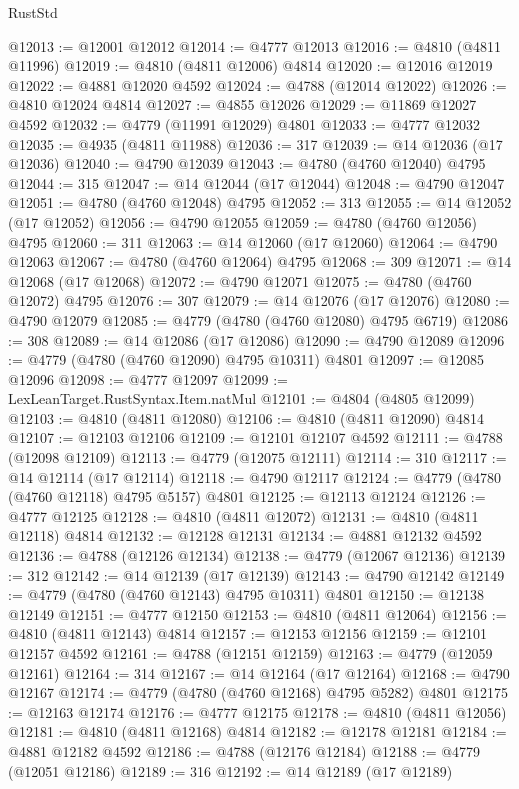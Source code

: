 \begin{lexlean}{RustStd}
\begin{coremodule}
@12013 := @12001 @12012
@12014 := @4777 @12013
@12016 := @4810 (@4811 @11996)
@12019 := @4810 (@4811 @12006) @4814
@12020 := @12016 @12019
@12022 := @4881 @12020 @4592
@12024 := @4788 (@12014 @12022)
@12026 := @4810 @12024 @4814
@12027 := @4855 @12026
@12029 := @11869 @12027 @4592
@12032 := @4779 (@11991 @12029) @4801
@12033 := @4777 @12032
@12035 := @4935 (@4811 @11988)
@12036 := 317
@12039 := @14 @12036 (@17 @12036)
@12040 := @4790 @12039
@12043 := @4780 (@4760 @12040) @4795
@12044 := 315
@12047 := @14 @12044 (@17 @12044)
@12048 := @4790 @12047
@12051 := @4780 (@4760 @12048) @4795
@12052 := 313
@12055 := @14 @12052 (@17 @12052)
@12056 := @4790 @12055
@12059 := @4780 (@4760 @12056) @4795
@12060 := 311
@12063 := @14 @12060 (@17 @12060)
@12064 := @4790 @12063
@12067 := @4780 (@4760 @12064) @4795
@12068 := 309
@12071 := @14 @12068 (@17 @12068)
@12072 := @4790 @12071
@12075 := @4780 (@4760 @12072) @4795
@12076 := 307
@12079 := @14 @12076 (@17 @12076)
@12080 := @4790 @12079
@12085 := @4779 (@4780 (@4760 @12080) @4795 @6719)
@12086 := 308
@12089 := @14 @12086 (@17 @12086)
@12090 := @4790 @12089
@12096 := @4779 (@4780 (@4760 @12090) @4795 @10311) @4801
@12097 := @12085 @12096
@12098 := @4777 @12097
@12099 := LexLeanTarget.RustSyntax.Item.natMul
@12101 := @4804 (@4805 @12099)
@12103 := @4810 (@4811 @12080)
@12106 := @4810 (@4811 @12090) @4814
@12107 := @12103 @12106
@12109 := @12101 @12107 @4592
@12111 := @4788 (@12098 @12109)
@12113 := @4779 (@12075 @12111)
@12114 := 310
@12117 := @14 @12114 (@17 @12114)
@12118 := @4790 @12117
@12124 := @4779 (@4780 (@4760 @12118) @4795 @5157) @4801
@12125 := @12113 @12124
@12126 := @4777 @12125
@12128 := @4810 (@4811 @12072)
@12131 := @4810 (@4811 @12118) @4814
@12132 := @12128 @12131
@12134 := @4881 @12132 @4592
@12136 := @4788 (@12126 @12134)
@12138 := @4779 (@12067 @12136)
@12139 := 312
@12142 := @14 @12139 (@17 @12139)
@12143 := @4790 @12142
@12149 := @4779 (@4780 (@4760 @12143) @4795 @10311) @4801
@12150 := @12138 @12149
@12151 := @4777 @12150
@12153 := @4810 (@4811 @12064)
@12156 := @4810 (@4811 @12143) @4814
@12157 := @12153 @12156
@12159 := @12101 @12157 @4592
@12161 := @4788 (@12151 @12159)
@12163 := @4779 (@12059 @12161)
@12164 := 314
@12167 := @14 @12164 (@17 @12164)
@12168 := @4790 @12167
@12174 := @4779 (@4780 (@4760 @12168) @4795 @5282) @4801
@12175 := @12163 @12174
@12176 := @4777 @12175
@12178 := @4810 (@4811 @12056)
@12181 := @4810 (@4811 @12168) @4814
@12182 := @12178 @12181
@12184 := @4881 @12182 @4592
@12186 := @4788 (@12176 @12184)
@12188 := @4779 (@12051 @12186)
@12189 := 316
@12192 := @14 @12189 (@17 @12189)

\end{coremodule}
\end{lexlean}
